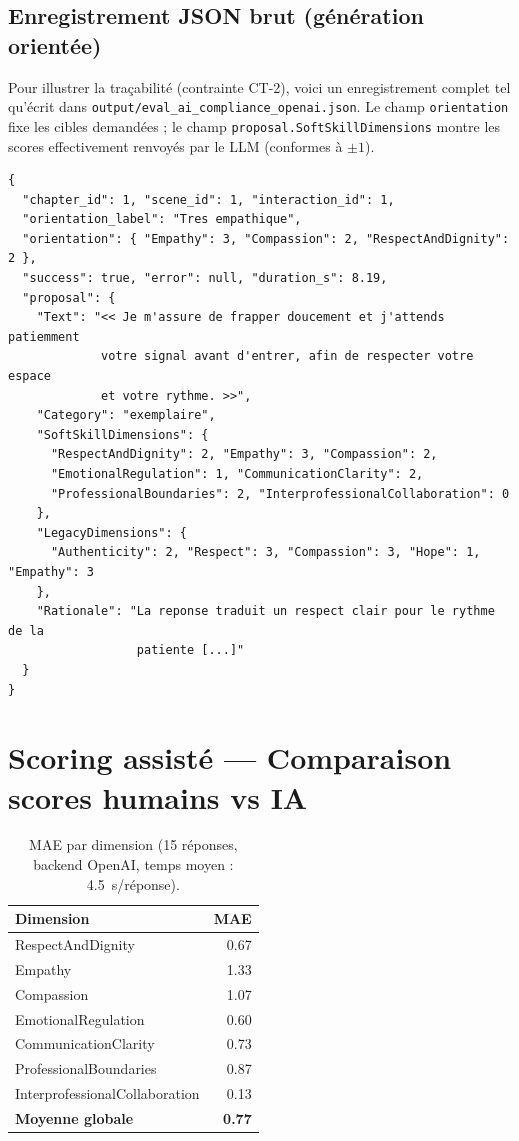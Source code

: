 \subsection{Enregistrement JSON brut (g\'en\'eration orient\'ee)}

Pour illustrer la tra\c{c}abilit\'e (contrainte CT-2), voici un enregistrement
complet tel qu'\'ecrit dans \texttt{output/eval\_ai\_compliance\_openai.json}.
Le champ \texttt{orientation} fixe les cibles demand\'ees ; le champ
\texttt{proposal.SoftSkillDimensions} montre les scores effectivement renvoy\'es
par le LLM (conformes \`a $\pm 1$).

\begin{lstlisting}[basicstyle=\ttfamily\scriptsize, frame=single, breaklines=true, xleftmargin=1em]
{
  "chapter_id": 1, "scene_id": 1, "interaction_id": 1,
  "orientation_label": "Tres empathique",
  "orientation": { "Empathy": 3, "Compassion": 2, "RespectAndDignity": 2 },
  "success": true, "error": null, "duration_s": 8.19,
  "proposal": {
    "Text": "<< Je m'assure de frapper doucement et j'attends patiemment
             votre signal avant d'entrer, afin de respecter votre espace
             et votre rythme. >>",
    "Category": "exemplaire",
    "SoftSkillDimensions": {
      "RespectAndDignity": 2, "Empathy": 3, "Compassion": 2,
      "EmotionalRegulation": 1, "CommunicationClarity": 2,
      "ProfessionalBoundaries": 2, "InterprofessionalCollaboration": 0
    },
    "LegacyDimensions": {
      "Authenticity": 2, "Respect": 3, "Compassion": 3, "Hope": 1, "Empathy": 3
    },
    "Rationale": "La reponse traduit un respect clair pour le rythme de la
                  patiente [...]"
  }
}
\end{lstlisting}


\section{Scoring assist\'e --- Comparaison scores humains vs IA}


\begin{table}[!htbp]
\centering
\begin{tabular}{l r}
\toprule
\textbf{Dimension} & \textbf{MAE} \\
\midrule
RespectAndDignity & 0.67 \\
Empathy & 1.33 \\
Compassion & 1.07 \\
EmotionalRegulation & 0.60 \\
CommunicationClarity & 0.73 \\
ProfessionalBoundaries & 0.87 \\
InterprofessionalCollaboration & 0.13 \\
\midrule
\textbf{Moyenne globale} & \textbf{0.77} \\
\bottomrule
\end{tabular}
\caption{MAE par dimension (15 r\'eponses, backend OpenAI, temps moyen : 4.5~s/r\'eponse).}
\end{table}


